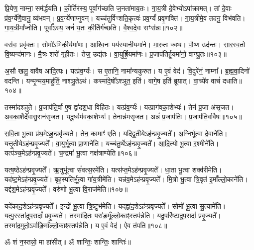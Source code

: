 प्रि॒येण॒ नाम्ना॒ सम॑र्द्धयति। 
की॒र्तिर॑स्य॒ पूर्वाग॑च्छति ज॒नता॑माय॒तः। 
गा॒य॒त्री दे॒वेभ्योऽपा᳚क्रामत्। 
तां दे॒वाः प्र॑व॒र्ग्ये॑णै॒वानु॒ व्य॑भवन्। 
प्र॒व॒र्ग्ये॑णाप्नुवन्। 
यच्च॑तुर्विꣳशति॒कृत्वः॑ प्रव॒र्ग्यं॑ प्रवृ॒णक्ति॑। 
गा॒य॒त्रीमे॒व तदनु॒ विभ॑वति। 
गा॒य॒त्रीमा᳚प्नोति। 
पूर्वा᳚ऽस्य॒ जनं॑ य॒तः की॒र्तिर्ग॑च्छति। 
वै॒श्व॒दे॒वः सꣳस॑न्नः॥१०२॥

वस॑वः॒ प्रवृ॑क्तः। 
सोमो॑ऽभिकी॒र्यमा॑णः। 
आ॒श्वि॒नः पय॑स्यानी॒यमा॑ने। 
मा॒रु॒तः क्वथ\sn{}। 
पौ॒ष्ण उद॑न्तः। 
सा॒र॒स्व॒तो वि॒ष्यन्द॑मानः। 
मै॒त्रः  शरो॑ गृही॒तः। 
तेज॒ उद्य॑तः। 
वा॒युर्ह्रि॒यमा॑णः। 
प्र॒जाप॑तिर्\mbox{}हू॒यमा॑नो॒ वाग्घु॒तः॥१०३॥

अ॒सौ खलु॒ वावैष आ॑दि॒त्यः। 
यत्प्र॑व॒र्ग्यः॑। 
स ए॒तानि॒ नामा᳚न्यकुरुत। 
य ए॒वं वेद॑। 
वि॒दुरे॑नं॒ नाम्ना᳚। 
ब्र॒ह्म॒वा॒दिनो॑ वदन्ति। 
यन्मृ॒न्मय॒माहु॑तिं॒ नाश्ञु॒तेऽथ॑। 
कस्मा॑दे॒षो᳚ऽश्ञुत॒ इति॑। 
वागे॒ष इति॑ ब्रूयात्। 
वा॒च्ये॑व वाचं॑ दधाति॥१०४॥

तस्मा॑दश्ञुते। 
प्र॒जाप॑ति॒र्वा ए॒ष द्वा॑दश॒धा विहि॑तः। 
यत्प्र॑व॒र्ग्यः॑। 
यत्प्राग॑वका॒शेभ्यः॑। 
तेन॑ प्र॒जा अ॑सृजत। 
अ॒व॒का॒शैर्दे॑वासु॒रान॑सृजत। 
यदू॒र्ध्वम॑वका॒शेभ्यः॑। 
तेनान्न॑म\-सृजत। 
अन्नं॑ प्र॒जाप॑तिः। 
प्र॒जाप॑ति॒र्वावैषः॥१०५॥
\anuvakamend[व॒द॒न्ति॒ त॒नुवा॒ सꣳस॑न्नो हू॒यमा॑नो॒ वाग्घु॒तो द॑धात्ये॒षः]

स॒वि॒ता भू॒त्वा प्र॑थ॒मेऽह॒न्प्रवृ॑ज्यते। 
तेन॒ कामाꣳ॑ एति। 
यद्द्वि॒तीयेऽह॑न्प्रवृ॒ज्यते᳚। 
अ॒ग्निर्भू॒त्वा दे॒वाने॑ति। 
यत्तृ॒तीयेऽह॑न्प्र\-वृ॒ज्यते᳚। 
वा॒युर्भू॒त्वा प्रा॒णाने॑ति। 
यच्च॑तु॒र्थेऽह॑न्प्रवृ॒ज्यते᳚। 
आ॒दि॒त्यो भू॒त्वा र॒श्मीने॑ति। 
यत्प॑ञ्च॒मेऽह॑न्प्रवृ॒ज्यते᳚। 
च॒न्द्रमा॑ भू॒त्वा नक्ष॑त्राण्येति॥१०६॥

यत्ष॒ष्ठेऽह॑न्प्रवृ॒ज्यते᳚। 
ऋ॒तुर्भू॒त्वा सं॑वत्स॒रमे॑ति। 
यत्स॑प्त॒मेऽह॑न्प्र\-वृ॒ज्यते᳚। 
धा॒ता भू॒त्वा शक्व॑रीमेति। 
यद॑ष्ट॒मेऽह॑न्प्रवृ॒ज्यते᳚। 
बृह॒स्पति॑र्भू॒त्वा गा॑य॒त्रीमे॑ति। 
यन्न॑व॒मेऽह॑न्प्रवृ॒ज्यते᳚। 
मि॒त्रो भू॒त्वा त्रि॒वृत॑ इ॒माँल्लो॒काने॑ति। 
यद्द॑श॒मेऽह॑न्प्रवृ॒ज्यते᳚। 
वरु॑णो भू॒त्वा वि॒राज॑मेति॥१०७॥

यदे॑काद॒शेऽह॑न्प्रवृ॒ज्यते᳚। 
इन्द्रो॑ भू॒त्वा त्रि॒ष्टुभ॑मेति। 
यद्द्वा॑द॒शेऽह॑न्प्र\-वृ॒ज्यते᳚। 
सोमो॑ भू॒त्वा सु॒त्यामे॑ति। 
यत्पु॒रस्ता॑दुप॒सदां᳚ प्रवृ॒ज्यते᳚। 
तस्मा॑दि॒तः परा॑ङ॒मूँल्लो॒काꣴ\-स्तप॑न्नेति। 
यदु॒परि॑ष्टादुप॒सदां᳚ प्रवृ॒ज्यते᳚। 
तस्मा॑द॒मुतो॒ऽर्वा\-ङि॒माँल्लो॒काꣴ\-स्तप॑न्नेति। 
य ए॒वं वेद॑। 
ऐव त॑पति॥१०८॥
\anuvakamend[नक्ष॑त्राण्येति वि॒राज॑मेति तपति]

ॐ शं न॒स्तन्नो॒ मा हा॑सीत्॥ ॐ शान्तिः॒ शान्तिः॒ शान्तिः॑॥

\closesection